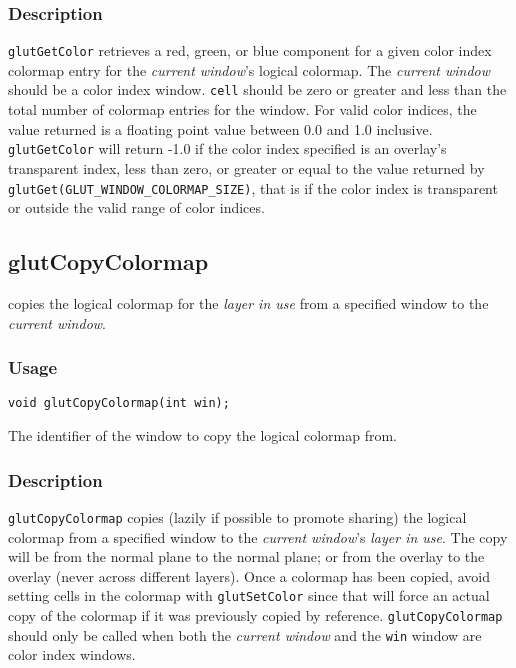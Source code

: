 \subsubsection*{Description}

{\tt glutGetColor} retrieves a red, green, or blue component for a given
color index colormap entry for the {\em current window}'s logical colormap.
The {\em current window} should be a color index window.
{\tt cell} should be zero or greater and less than the total number of colormap entries
for the window.
For valid color indices, the value returned is a floating point value between 0.0
and 1.0 inclusive.  {\tt glutGetColor} will return -1.0 if the color
index specified is an overlay's transparent index, less than zero, or
greater or equal to the value returned by {\tt
glutGet(GLUT\_WINDOW\_COLORMAP\_SIZE)}, that is if the color index is
transparent or outside the valid range of color indices.

\subsection{glutCopyColormap}

 copies the logical
colormap for the {\em layer in use} from a specified window to the {\em current window}.

\subsubsection*{Usage}
\begin{verbatim}
void glutCopyColormap(int win);
\end{verbatim}
\begin{description}
\itemsep 0in
\item[{\tt win}]
The identifier of the window to copy the logical colormap from.
\end{description}

\subsubsection*{Description}

{\tt glutCopyColormap} copies (lazily if possible to promote sharing) the logical
colormap from a specified window to the {\em current window}'s {\em layer in use}.
The copy will be from the normal plane to the normal plane; or from the overlay
to the overlay (never across different layers).  Once a colormap has been
copied, avoid setting cells in the colormap with {\tt glutSetColor} since that
will force an actual copy of the colormap if it was previously copied by reference.
{\tt glutCopyColormap} should only be called when both the {\em current window} and
the {\tt win} window are color index windows.

